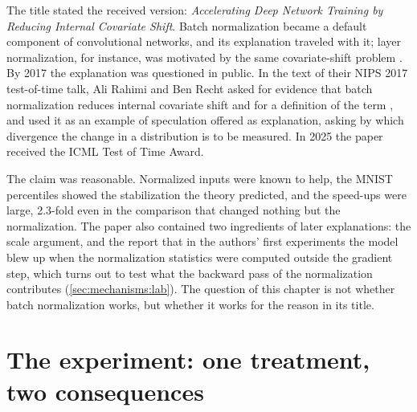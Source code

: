 \begin{refsection}
The title stated the received version: \emph{Accelerating Deep Network Training by Reducing Internal Covariate Shift}. Batch normalization became a default component of convolutional networks, and its explanation traveled with it; layer normalization, for instance, was motivated by the same covariate-shift problem \parencite{BaKirosHinton2016}. By 2017 the explanation was questioned in public. In the text of their NIPS 2017 test-of-time talk, Ali Rahimi and Ben Recht asked for evidence that batch normalization reduces internal covariate shift and for a definition of the term \parencite{RahimiRecht2017}, and \textcite{LiptonSteinhardt2019} used it as an example of speculation offered as explanation, asking by which divergence the change in a distribution is to be measured. In 2025 the paper received the ICML Test of Time Award.

The claim was reasonable. Normalized inputs were known to help, the MNIST percentiles showed the stabilization the theory predicted, and the speed-ups were large, 2.3-fold even in the comparison that changed nothing but the normalization. The paper also contained two ingredients of later explanations: the scale argument, and the report that in the authors' first experiments the model blew up when the normalization statistics were computed outside the gradient step, which turns out to test what the backward pass of the normalization contributes (\cref{sec:mechanisms:lab}). The question of this chapter is not whether batch normalization works, but whether it works for the reason in its title.

\section{The experiment: one treatment, two consequences}\label{sec:mechanisms:experiment}


\end{refsection}
